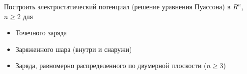 \begin{tproblem}
  Построить электростатический потенциал (решение уравнения Пуассона)
  в $R^n$, $n≥2$ для
  \begin{itemize}
  \item Точечного заряда
  \item Заряженного шара (внутри и снаружи)
  \item Заряда, равномерно распределенного по двумерной плоскости ($n≥3$)
  \end{itemize}
\end{tproblem}

